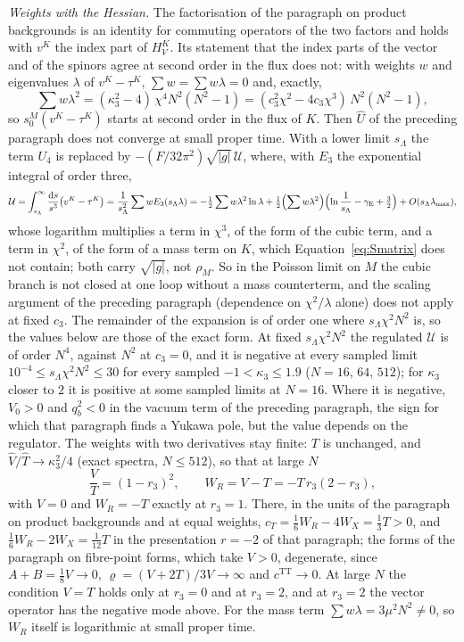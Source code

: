 \emph{Weights with the Hessian.} The factorisation of the paragraph on product backgrounds is an identity for commuting operators of the two factors and holds with \(v^K\) the index part of \(H_V^K\). Its statement that the index parts of the vector and of the spinors agree at second order in the flux does not: with weights \(w\) and eigenvalues \(\lambda\) of \(v^K-\tau^K\), \(\sum w=\sum w\lambda=0\) and, exactly,
\[
  \sum w\lambda^2=(\kappa_3^2-4)\,\chi^4N^2(N^2-1)=(c_3^2\chi^2-4c_3\chi^3)\,N^2(N^2-1),
\]
so \(s_0^M(v^K-\tau^K)\) starts at second order in the flux of \(K\). Then \(\hat U\) of the preceding paragraph does not converge at small proper time. With a lower limit \(s_\Lambda\) the term \(U_4\) is replaced by \(-(F/32\pi^2)\sqrt{|g|}\,\mathcal U\), where, with \(E_3\) the exponential integral of order three,
\[
  \mathcal U=\int_{s_\Lambda}^\infty\frac{\mathrm ds}{s^3}\bigl(v^K-\tau^K\bigr)
  =\frac1{s_\Lambda^2}\sum wE_3(s_\Lambda\lambda)
  =-\tfrac12\sum w\lambda^2\ln\lambda+\tfrac12\Bigl(\sum w\lambda^2\Bigr)\Bigl(\ln\frac1{s_\Lambda}-\gamma_{\mathrm E}+\tfrac32\Bigr)+O(s_\Lambda\lambda_{\max}),
\]
whose logarithm multiplies a term in \(\chi^3\), of the form of the cubic term, and a term in \(\chi^2\), of the form of a mass term on \(K\), which Equation~\eqref{eq:Smatrix} does not contain; both carry \(\sqrt{|g|}\), not \(\rho_M\). So in the Poisson limit on \(M\) the cubic branch is not closed at one loop without a mass counterterm, and the scaling argument of the preceding paragraph (dependence on \(\chi^2/\lambda\) alone) does not apply at fixed \(c_3\). The remainder of the expansion is of order one where \(s_\Lambda\chi^2N^2\) is, so the values below are those of the exact form. At fixed \(s_\Lambda\chi^2N^2\) the regulated \(\mathcal U\) is of order \(N^4\), against \(N^2\) at \(c_3=0\), and it is negative at every sampled limit \(10^{-4}\le s_\Lambda\chi^2N^2\le30\) for every sampled \(-1<\kappa_3\le1.9\) (\(N=16\), \(64\), \(512\)); for \(\kappa_3\) closer to \(2\) it is positive at some sampled limits at \(N=16\). Where it is negative, \(V_0>0\) and \(q_b^2<0\) in the vacuum term of the preceding paragraph, the sign for which that paragraph finds a Yukawa pole, but the value depends on the regulator. The weights with two derivatives stay finite: \(T\) is unchanged, and \(\hat V/\hat T\to\kappa_3^2/4\) (exact spectra, \(N\le512\)), so that at large \(N\)
\[
  \frac VT=(1-r_3)^2,\qquad W_R=V-T=-T\,r_3(2-r_3),
\]
with \(V=0\) and \(W_R=-T\) exactly at \(r_3=1\). There, in the units of the paragraph on product backgrounds and at equal weights, \(c_T=\tfrac16W_R-4W_X=\tfrac13T>0\), and \(\tfrac16W_R-2W_X=\tfrac1{12}T\) in the presentation \(r=-2\) of that paragraph; the forms of the paragraph on fibre-point forms, which take \(V>0\), degenerate, since \(A+B=\tfrac18V\to0\), \(\varrho=(V+2T)/3V\to\infty\) and \(c^{\mathrm{TT}}\to0\). At large \(N\) the condition \(V=T\) holds only at \(r_3=0\) and at \(r_3=2\), and at \(r_3=2\) the vector operator has the negative mode above. For the mass term \(\sum w\lambda=3\mu^2N^2\ne0\), so \(W_R\) itself is logarithmic at small proper time.

